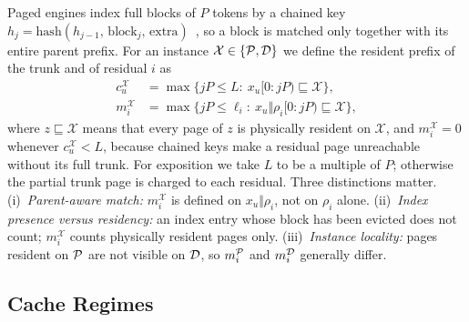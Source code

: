 Paged engines index full blocks of $P$ tokens by a chained key $h_j=\mathrm{hash}(h_{j-1},\,\text{block}_j,\,\text{extra})$~\cite{vllm,sglang}, so a block is matched only together with its entire parent prefix.
For an instance $\mathcal{X}\in\{\mathcal{P},\mathcal{D}\}$ we define the resident prefix of the trunk and of residual $i$ as
\begin{align}
c_u^{\mathcal{X}} &= \max\{jP\le L:\ x_u[0{:}jP)\sqsubseteq\mathcal{X}\}, \label{eq:mi}\\
m_i^{\mathcal{X}} &= \max\{jP\le \ell_i:\ x_u\Vert\rho_i[0{:}jP)\sqsubseteq\mathcal{X}\}, \nonumber
\end{align}
where $z\sqsubseteq\mathcal{X}$ means that every page of $z$ is physically resident on $\mathcal{X}$,
and $m_i^{\mathcal{X}}{=}0$ whenever $c_u^{\mathcal{X}}{<}L$, because chained keys make a residual page unreachable without its full trunk.
For exposition we take $L$ to be a multiple of $P$; otherwise the partial trunk page is charged to each residual.
Three distinctions matter.
(i)~\emph{Parent-aware match:} $m_i^{\mathcal{X}}$ is defined on $x_u\Vert\rho_i$, not on $\rho_i$ alone.
(ii)~\emph{Index presence versus residency:} an index entry whose block has been evicted does not count; $m_i^{\mathcal{X}}$ counts physically resident pages only.
(iii)~\emph{Instance locality:} pages resident on $\mathcal{P}$ are not visible on $\mathcal{D}$, so $m_i^{\mathcal{P}}$ and $m_i^{\mathcal{D}}$ generally differ.

\subsection{Cache Regimes}
\label{sec:regimes}

